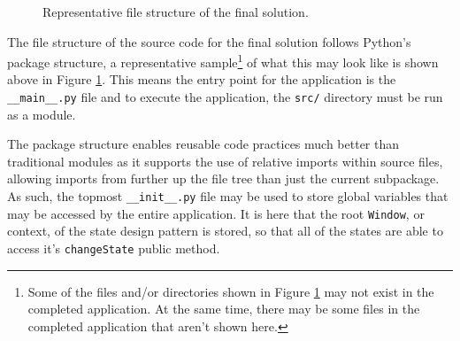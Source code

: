 \documentclass{report}
\begin{document}
\begin{figure}[h!]
	\begin{dirtreex}[elbow radius=0.25\baselineskip]
	\end{dirtreex}
	\caption{Representative file structure of the final solution.}
	\label{fig:file_structure}
\end{figure}

The file structure of the source code for the final solution follows Python's
package structure, a representative sample\footnote{\label{foot:sample_files}%
Some of the files and/or directories shown in Figure \ref{fig:file_structure}
may not exist in the completed application. At the same time, there may be
some files in the completed application that aren't shown here.} of what this
may look like is shown above in Figure \ref{fig:file_structure}. This means the
entry point for the application is the \texttt{\_\_main\_\_.py} file and to
execute the application, the \texttt{src/} directory must be run as a module.

The package structure enables reusable code practices much better than
traditional modules as it supports the use of relative imports within source
files, allowing imports from further up the file tree than just the current
subpackage. As such, the topmost \texttt{\_\_init\_\_.py} file may be used to
store global variables that may be accessed by the entire application. It is
here that the root \texttt{Window}, or context, of the state design pattern is
stored, so that all of the states are able to access it's \texttt{changeState}
public method.
\end{document}
